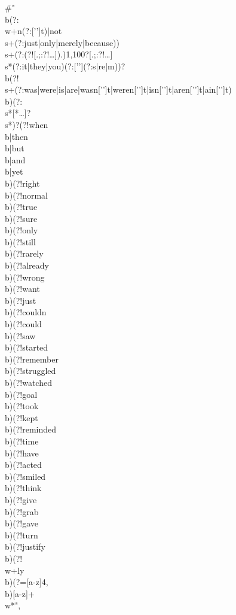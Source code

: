 \documentclass[11pt]{article}
\begin{document}
\begin{cfgblock}
  #"\\b(?:\\w+n(?:['’]t)|not\\s+(?:just|only|merely|because))\\s+(?:(?![.;:?!…]).){1,100}?[.;:?!…]\\s*(?:it|they|you)(?:['’](?:s|re|m))?\\b(?!\\s+(?:was|were|is|are|wasn['’]t|weren['’]t|isn['’]t|aren['’]t|ain['’]t)\\b)(?:\\s*[*…]?\\s*)?(?!when\\b|then\\b|but\\b|and\\b|yet\\b)(?!right\\b)(?!normal\\b)(?!true\\b)(?!sure\\b)(?!only\\b)(?!still\\b)(?!rarely\\b)(?!already\\b)(?!wrong\\b)(?!want\\b)(?!just\\b)(?!couldn\\b)(?!could\\b)(?!saw\\b)(?!started\\b)(?!remember\\b)(?!struggled\\b)(?!watched\\b)(?!goal\\b)(?!took\\b)(?!kept\\b)(?!reminded\\b)(?!time\\b)(?!have\\b)(?!acted\\b)(?!smiled\\b)(?!think\\b)(?!give\\b)(?!grab\\b)(?!gave\\b)(?!turn\\b)(?!justify\\b)(?!\\w+ly\\b)(?=[a-z]{4,}\\b)[a-z]+\\w*",


\end{cfgblock}
\end{document}
